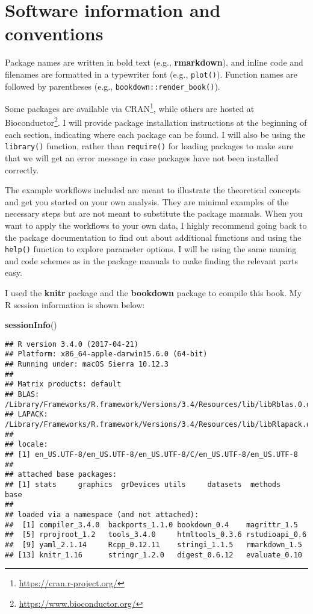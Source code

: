 \documentclass[12pt,]{krantz}
\newenvironment{Shaded}{\begin{snugshade}}{\end{snugshade}}
\newcommand{\KeywordTok}[1]{\textcolor[rgb]{0.27,0.27,0.27}{\textbf{{#1}}}}
\newcommand{\NormalTok}[1]{{#1}}
\renewcommand{\href}[2]{#2\footnote{\url{#1}}}
\theoremstyle{definition}
\theoremstyle{definition}
\theoremstyle{remark}
\begin{document}
\section*{Software information and
conventions}\label{software-information-and-conventions}


Package names are written in bold text (e.g., \textbf{rmarkdown}), and
inline code and filenames are formatted in a typewriter font (e.g.,
\texttt{plot()}). Function names are followed by parentheses (e.g.,
\texttt{bookdown::render\_book()}).

Some packages are available via
\href{https://cran.r-project.org/}{CRAN}, while others are
hosted at
\href{https://www.bioconductor.org/}{Bioconductor}.
I will provide package installation instructions at the beginning of
each section, indicating where each package can be found. I will also be
using the \texttt{library()} function, rather than \texttt{require()}
for loading packages to make sure that we will get an error message in
case packages have not been installed correctly.

The example workflows included are meant to illustrate the theoretical
concepts and get you started on your own analysis. They are minimal
examples of the necessary steps but are not meant to substitute the
package manuals. When you want to apply the workflows to your own data,
I highly recommend going back to the package documentation to find out
about additional functions and using the \texttt{help()} function to
explore parameter options. I will be using the same naming and code
schemes as in the package manuals to make finding the relevant parts
easy.

I used the \textbf{knitr} package and the
\textbf{bookdown} package to compile this book. My R
session information is shown below:

\begin{Shaded}
\begin{Highlighting}[]
\KeywordTok{sessionInfo}\NormalTok{()}
\end{Highlighting}
\end{Shaded}

\begin{verbatim}
## R version 3.4.0 (2017-04-21)
## Platform: x86_64-apple-darwin15.6.0 (64-bit)
## Running under: macOS Sierra 10.12.3
## 
## Matrix products: default
## BLAS: /Library/Frameworks/R.framework/Versions/3.4/Resources/lib/libRblas.0.dylib
## LAPACK: /Library/Frameworks/R.framework/Versions/3.4/Resources/lib/libRlapack.dylib
## 
## locale:
## [1] en_US.UTF-8/en_US.UTF-8/en_US.UTF-8/C/en_US.UTF-8/en_US.UTF-8
## 
## attached base packages:
## [1] stats     graphics  grDevices utils     datasets  methods   base     
## 
## loaded via a namespace (and not attached):
##  [1] compiler_3.4.0  backports_1.1.0 bookdown_0.4    magrittr_1.5   
##  [5] rprojroot_1.2   tools_3.4.0     htmltools_0.3.6 rstudioapi_0.6 
##  [9] yaml_2.1.14     Rcpp_0.12.11    stringi_1.1.5   rmarkdown_1.5  
## [13] knitr_1.16      stringr_1.2.0   digest_0.6.12   evaluate_0.10
\end{verbatim}
\end{document}
